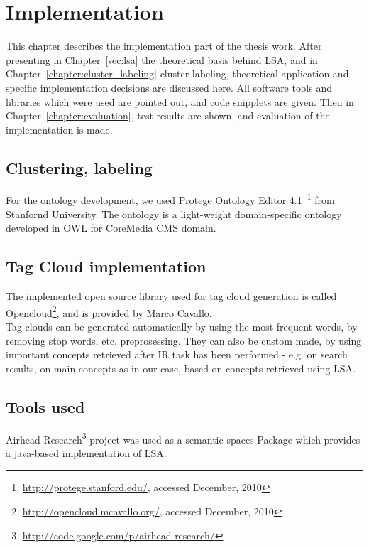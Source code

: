 \chapter{Implementation}
\label{sec:implementation}

This chapter describes the implementation part of the thesis work. After presenting in Chapter~\ref{sec:lsa} the theoretical basis behind \gls{LSA}, and in Chapter~\ref{chapter:cluster_labeling} cluster labeling, theoretical application and specific implementation decisions are discussed here. All software tools and libraries which were used are pointed out, and code snipplets are given. Then in Chapter~\ref{chapter:evaluation}, test results are shown, and evaluation of the implementation is made. \\

\section{Clustering, labeling}
For the ontology development, we used Protege Ontology Editor 4.1~\footnote{\url{http://protege.stanford.edu/}, accessed December, 2010} from Stanfornd University. The ontology is a light-weight domain-specific ontology developed in OWL for CoreMedia \gls{CMS} domain. \\

\section{Tag Cloud implementation}
\label{sec:implementation:tag_cloud}
The implemented open source library used for tag cloud generation is called Opencloud\footnote{\url{http://opencloud.mcavallo.org/}, accessed December, 2010}, and is provided by Marco Cavallo.\\

Tag clouds can be generated automatically by using the most frequent words, by removing stop words, etc. preprosessing. They can also be custom made, by using important concepts retrieved after \gls{IR} task has been performed - e.g. on search results, on main concepts as in our case, based on concepts retrieved using \gls{LSA}. \\

\section{Tools used}
\label{sec:implementation:tools_used}
Airhead Research\footnote{\url{http://code.google.com/p/airhead-research/}} project was used as a semantic spaces Package which provides a java-based implementation of \gls{LSA}.\\


